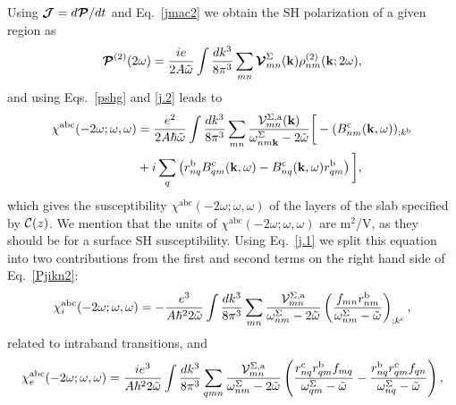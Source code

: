 \documentclass[floatfix,prb,aps,superscriptaddress,showpacs,letterpaper]{revtex4}
\begin{document}
Using
$\boldsymbol{\mathcal{\cal J}}=d\boldsymbol{\mathcal{\cal P}}/dt$ 
and Eq.~\eqref{jmac2} 
we obtain the SH polarization of a given region as
\begin{equation}
\boldsymbol{\mathcal{\cal P}}^{(2)}(2\omega)
=\frac{ie}{2A\tilde\omega}
\int \frac{dk^3}{8\pi^3}
\sum_{mn}
\boldsymbol{\mathcal{\cal V}}^{\Sigma}_{mn}(\mathbf{k})
\rho^{(2)}_{nm}(\mathbf{k};2\omega)
,
\label{Pjikn}
\end{equation}
and using Eqs.~\eqref{pshg} and \eqref{j.2} 
leads to
\begin{align}
\chi^{\mathrm{a}\mathrm{b}\mathrm{c}}(-2\omega;\omega,\omega) 
&=
\frac{e^2}{2A\hbar\tilde\omega}
\int \frac{dk^3}{8\pi^3}
\sum_{mn}
\frac{{\mathbf{\cal V}}^{\Sigma,\mathrm{a}}_{mn}(\mathbf{k})}
{\omega^\Sigma_{nm\mathbf{k}}-2\tilde\omega}
\bigg[
-(B_{nm}^{\mathrm{c}}(\mathbf{k},\omega))_{;k^{\mathrm{b}}}
\nonumber \\
&
+i\sum_q\left(r_{nq}^{\mathrm{b}}B_{qm}^{\mathrm{c}}(\mathbf{k},\omega) -
  B_{nq}^{\mathrm{c}}(\mathbf{k},\omega) 
  r_{qm}^{\mathrm{b}}\right)
\bigg]
,
\label{Pjikn2}
\end{align}
which gives the susceptibility 
$\chi^{\mathrm{a}\mathrm{b}\mathrm{c}}(-2\omega;\omega,\omega)$ 
of the layers of the slab specified by ${\mathbf{\cal C}}(z)$. 
We mention that the units of 
$\chi^{\mathrm{a}\mathrm{b}\mathrm{c}}(-2\omega;\omega,\omega)$
are m$^2$/V, as they should be for a surface SH susceptibility.
Using Eq.~\eqref{j.1} we
split this equation into
two contributions from the first and second terms on the right hand side
of Eq.~\eqref{Pjikn2}:
\begin{equation}
\chi^{\mathrm{a}\mathrm{b}\mathrm{c}}_i (-2\omega;\omega,\omega)
=-\frac{e^3}{A\hbar^22\tilde\omega}
\int \frac{dk^3}{8\pi^3}
\sum_{mn}
\frac{{\mathbf{\cal V}}_{mn}^{\Sigma,\mathrm{a}}}{\omega^\Sigma_{nm}-2\tilde\omega}
\left(\frac{f_{mn}r_{nm}^{\mathrm{b}}}{\omega^\Sigma_{nm}-\tilde\omega}\right)_{;k^{\mathrm{c}}}
,
\label{chii}
\end{equation} 
related to intraband transitions, and 
\begin{equation}
\chi^{\mathrm{a}\mathrm{b}\mathrm{c}}_e (-2\omega;\omega,\omega)
=\frac{ie^3}{A\hbar^22\tilde\omega}
\int \frac{dk^3}{8\pi^3}
\sum_{qmn}
\frac{{\mathbf{\cal V}}_{mn}^{\Sigma,\mathrm{a}}}{\omega^\Sigma_{nm}-2\tilde\omega}
\left(
\frac{r_{nq}^{\mathrm{c}} r_{qm}^{\mathrm{b}} 
f_{mq}}{\omega^\Sigma_{qm}-\tilde\omega}
-\frac{r_{nq}^{\mathrm{b}} r_{qm}^{\mathrm{c}} 
f_{qn}}{\omega^\Sigma_{nq}-\tilde\omega}
\right),
\label{chie}
\end{equation} 
\end{document}
